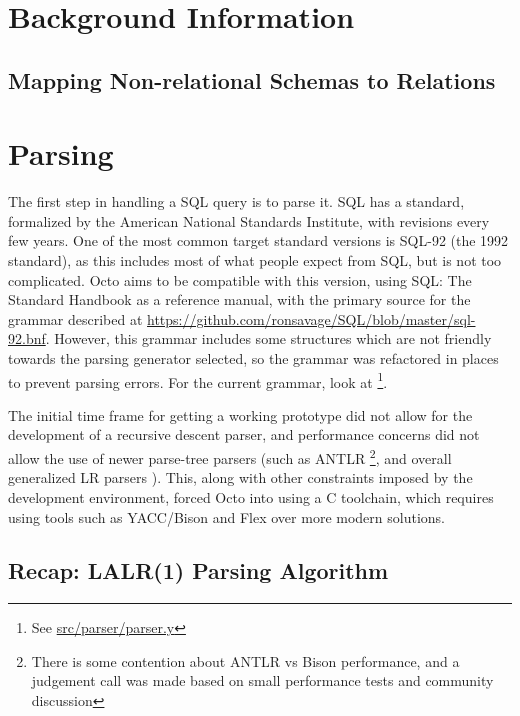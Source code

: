 \documentclass[]{article}
\newcommand{\gitlab}[1]{\footnote{See \href{https://gitlab.com/YottaDB/DBMS/YDBOcto/blob/master/#1}{#1}}}
\begin{document}
\section{Background Information}


\subsection{Mapping Non-relational Schemas to Relations} \label{sec:background_mapping}

\section{Parsing} \label{sec:parsing}

The first step in handling a SQL query is to parse it.
SQL has a standard, formalized by the American National Standards Institute, with revisions every few years.
One of the most common target standard versions is SQL-92 (the 1992 standard), as this includes most of what people expect from SQL, but is not too complicated.
Octo aims to be compatible with this version, using SQL: The Standard Handbook \cite{cannan1993sql} as a reference manual, with the primary source for the grammar described at \url{https://github.com/ronsavage/SQL/blob/master/sql-92.bnf}\cite{ronsavage2003sql}.
However, this grammar includes some structures which are not friendly towards the parsing generator selected, so the grammar was refactored in places to prevent parsing errors.
For the current grammar, look at \gitlab{src/parser/parser.y}.

The initial time frame for getting a working prototype did not allow for the development of a recursive descent parser, and performance concerns did not allow the use of newer parse-tree parsers (such as ANTLR \cite{parr2013definitive} \footnote{There is some contention about ANTLR vs Bison performance, and a judgement call was made based on small performance tests and community discussion}, and overall generalized LR parsers \cite{lang1974deterministic}).
This, along with other constraints imposed by the development environment, forced Octo into using a C toolchain, which requires using tools such as YACC/Bison and Flex over more modern solutions.

\subsection{Recap: LALR(1) Parsing Algorithm}
\end{document}
